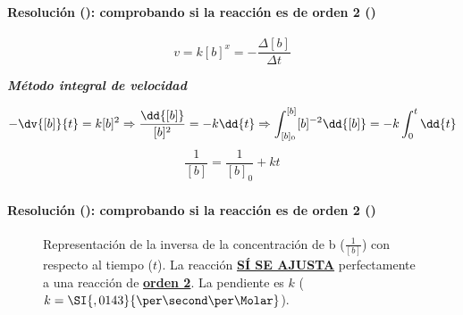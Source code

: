 \begin{frame}
    \frametitle{\ejerciciocmd}
    \framesubtitle{Resolución (): comprobando si la reacción es de orden 2 ()}
     
    $$
        v = k[b]^x = -\frac{\Delta[b]}{\Delta t}
    $$
    \begin{center}
        {\Large \textbf{\textit{Método integral de velocidad}}}
    \end{center}
    \begin{overprint}
            $$
                -\dv{[b]}{t} = k[b]^2\Rightarrow\frac{\dd{[b]}}{[b]^2} = -k\dd{t}\Rightarrow\int_{[b]_0}^{[b]}[b]^{-2}\dd{[b]} = -k\int_{0}^{t}\dd{t}
            $$
            $$
                \frac{1}{[b]} = \frac{1}{[b]_0} + kt
            $$
    \end{overprint}
\end{frame}

\begin{frame}
    \frametitle{\ejerciciocmd}
    \framesubtitle{Resolución (): comprobando si la reacción es de orden 2 ()}
    \begin{center}
        \begin{figure}
            \caption{Representación de la inversa de la concentración de b ($\frac{1}{[b]}$) con respecto al tiempo ($t$). La reacción \textbf{\underline{SÍ SE AJUSTA}} perfectamente a una reacción de \textbf{\underline{orden 2}}. La pendiente es $k$ ($k=\SI{,0143}{\per\second\per\Molar}$).}
            
        \end{figure}
    \end{center}
\end{frame}
